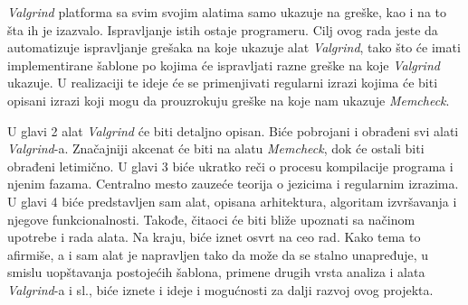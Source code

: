 \documentclass[12pt,oneside]{memoir}
\theoremstyle{plain}
\theoremstyle{definition}
\begin{document}
\textit{Valgrind} platforma sa svim svojim alatima samo ukazuje na greške, kao i na to šta ih je izazvalo. Ispravljanje istih ostaje programeru. Cilj ovog rada jeste da automatizuje ispravljanje grešaka na koje ukazuje alat \textit{Valgrind}, tako što će imati implementirane šablone po kojima će ispravljati razne greške na koje \textit{Valgrind} ukazuje. U realizaciji te ideje će se primenjivati regularni izrazi kojima će biti opisani izrazi koji mogu da prouzrokuju greške na koje nam ukazuje \textit{Memcheck}.

U glavi 2 alat \textit{Valgrind} će biti detaljno opisan. Biće pobrojani i obrađeni svi alati \textit{Valgrind}-a.  Značajniji akcenat će biti na alatu \textit{Memcheck}, dok će ostali biti obrađeni letimično. U glavi 3 biće ukratko reči o procesu kompilacije programa i njenim fazama. Centralno mesto zauzeće teorija o jezicima i regularnim izrazima. U glavi 4 biće predstavljen sam alat, opisana arhitektura, algoritam izvršavanja i njegove funkcionalnosti. Takođe, čitaoci će biti bliže upoznati sa načinom upotrebe i rada alata. Na kraju, biće iznet osvrt na ceo rad. Kako tema to afirmiše, a i sam alat je napravljen tako da može da se stalno unapređuje, u smislu uopštavanja postojećih šablona, primene drugih vrsta analiza i alata \textit{Valgrind}-a i sl., biće iznete i ideje i mogućnosti za dalji razvoj ovog projekta.
\end{document}
